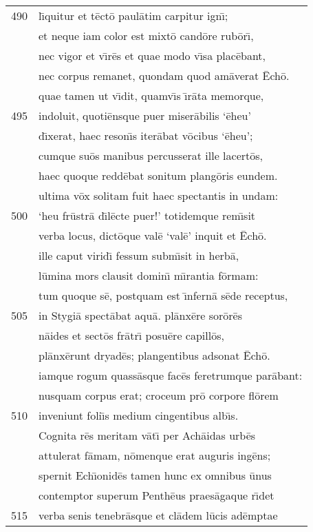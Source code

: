 \documentclass[paper=6in:9in,pagesize=pdftex,
               headinclude=on,footinclude=on,12pt]{scrbook}
\begin{document}
\begin{longtable}[p]{ r l }
490 & l\={\i}quitur et t\=ect\=o paul\=atim carpitur ign\={\i};\\ 
 & et neque iam color est mixt\=o cand\=ore rub\=or\={\i},\\ 
 & nec vigor et v\={\i}r\=es et quae modo v\={\i}sa plac\=ebant,\\ 
 & nec corpus remanet, quondam quod am\=averat \=Ech\=o.\\ 
 & quae tamen ut v\={\i}dit, quamv\={\i}s \={\i}r\=ata memorque,\\ 
495 & indoluit, quoti\=ensque puer miser\=abilis `\=eheu'\\ 
 & d\={\i}xerat, haec reson\={\i}s iter\=abat v\=ocibus `\=eheu';\\ 
 & cumque su\=os manibus percusserat ille lacert\=os,\\ 
 & haec quoque redd\=ebat sonitum plang\=oris eundem.\\ 
 & ultima v\=ox solitam fuit haec spectantis in undam:\\ 
500 & `heu fr\=ustr\=a d\={\i}l\=ecte puer!' totidemque rem\={\i}sit\\ 
 & verba locus, dict\=oque val\=e `val\=e' inquit et \=Ech\=o.\\ 
 & ille caput virid\={\i} fessum subm\={\i}sit in herb\=a,\\ 
 & l\=umina mors clausit domin\={\i} m\={\i}rantia f\=ormam:\\ 
 & tum quoque s\=e, postquam est \={\i}nfern\=a s\=ede receptus,\\ 
505 & in Stygi\=a spect\=abat aqu\=a. pl\=anx\=ere sor\=or\=es\\ 
 & n\=aides et sect\=os fr\=atr\={\i} posu\=ere capill\=os,\\ 
 & pl\=anx\=erunt dryad\=es; plangentibus adsonat \=Ech\=o.\\ 
 & iamque rogum quass\=asque fac\=es feretrumque par\=abant:\\ 
 & nusquam corpus erat; croceum pr\=o corpore fl\=orem\\ 
510 & inveniunt foli\={\i}s medium cingentibus alb\={\i}s.\\ 
 & \indent Cognita r\=es meritam v\=at\={\i} per Ach\=aidas urb\=es\\ 
 & attulerat f\=amam, n\=omenque erat auguris ing\=ens;\\ 
 & spernit Ech\={\i}onid\=es tamen hunc ex omnibus \=unus\\ 
 & contemptor superum Penth\=eus praes\=agaque r\={\i}det\\ 
515 & verba senis tenebr\=asque et cl\=adem l\=ucis ad\=emptae\\ 

\end{longtable}
\end{document}
